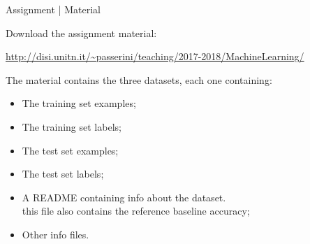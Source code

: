 \documentclass{beamer}
\begin{document}

\begin{frame}{Assignment | Material}

Download the assignment material:

{\footnotesize \url{http://disi.unitn.it/~passerini/teaching/2017-2018/MachineLearning/}}

The material contains the three datasets, each one containing:
    \begin{itemize}
    \item The training set examples;
    \item The training set labels;
    \item The test set examples;
    \item The test set labels;
    \item A README containing info about the dataset. \\ this file also contains
          the reference baseline accuracy;
    \item Other info files.
    \end{itemize}

\end{frame}


%
%
%
%
%

\end{document}
